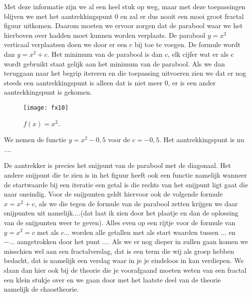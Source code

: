 \documentclass[11pt,fleqn]{book} %
\begin{document}
Met deze informatie zijn we al een heel stuk op weg, maar met deze toepassingen blijven we met het aantrekkingspunt 0 en zal er dus nooit een mooi groot fractal figuur uitkomen. Daarom moeten we ervoor zorgen dat de parabool waar we het hierboven over hadden moet kunnen worden verplaats. De parabool $y=x^2$ verticaal verplaatsen doen we door er een c bij toe te voegen. De formule wordt dan $y=x^2+c$. Het minimum van de parabool is dan $c$, elk cijfer wat er als c wordt gebruikt staat gelijk aan het minimum van de parabool. Als we dan teruggaan naar het begrip itereren en die toepassing uitvoeren zien we dat er nog steeds een aantrekkingspunt is alleen dat is niet meer 0, er is een ander aantrekkingspunt is gekomen.
\begin{figure}[h]
	\centering\texttt{[image: fx10]}
	\caption{$f(x)=x^2$.}
	\label{fig:fx10}
\end{figure}
We nemen de functie $y = x^2-0,5$ voor de $c= -0,5$. Het aantrekkingspunt is nu  $\ldots$.

De aantrekker is precies het snijpunt van de parabool met de diagonaal. Het andere snijpunt die te zien is in het figuur heeft ook een functie namelijk wanneer de startwaarde bij een iteratie een getal is die rechts van het snijpunt ligt gaat die naar oneindig. Voor de snijpunten geldt hiervoor ook de volgende formule $x=x^2+c$, als we die tegen de formule van de parabool zetten krijgen we daar snijpunten uit namelijk....(dat laat ik zien door het plaatje en dan de oplossing van de snijpunten weer te geven). Alles even op een rijtje voor de formule van $y=x^2=c$ met als $c\ldots$ worden alle getallen met als start waarden tussen $\ldots$ en $-\ldots$ aangetrokken door het punt $\ldots$.
Als we er nog dieper in zullen gaan komen we misschien wel aan een fractalverslag, dat is een term die wij als groep hebben bedacht, dat is namelijk een verslag waar in je je eindeloos in kan verdiepen. We slaan dan hier ook bij de theorie die je voorafgaand moeten weten van een fractal een klein stukje over en we gaan door met het laatste deel van de theorie namelijk de chaostheorie.
\end{document}

